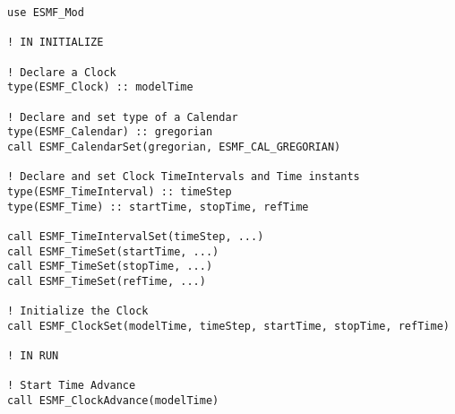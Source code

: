 
\begin{verbatim}
use ESMF_Mod

! IN INITIALIZE

! Declare a Clock
type(ESMF_Clock) :: modelTime

! Declare and set type of a Calendar
type(ESMF_Calendar) :: gregorian
call ESMF_CalendarSet(gregorian, ESMF_CAL_GREGORIAN)

! Declare and set Clock TimeIntervals and Time instants
type(ESMF_TimeInterval) :: timeStep
type(ESMF_Time) :: startTime, stopTime, refTime

call ESMF_TimeIntervalSet(timeStep, ...)
call ESMF_TimeSet(startTime, ...)
call ESMF_TimeSet(stopTime, ...)
call ESMF_TimeSet(refTime, ...)

! Initialize the Clock
call ESMF_ClockSet(modelTime, timeStep, startTime, stopTime, refTime)

! IN RUN

! Start Time Advance
call ESMF_ClockAdvance(modelTime)
\end{verbatim}


